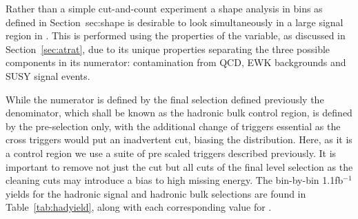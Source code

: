 Rather than a simple cut-and-count experiment a shape analysis in \HT bins as defined in Section~{sec:shape} is desirable to look simultaneously in a large signal region in \HT. This is performed using the properties of the \RaT variable, as discussed in Section~\ref{sec:atrat}, due to its unique properties separating the three possible components in its numerator: contamination from QCD, EWK backgrounds and SUSY signal events.

While the numerator is defined by the final selection defined previously the denominator, which shall be known as the hadronic bulk control region, is defined by the pre-selection only, with the additional change of triggers essential as the cross triggers would put an inadvertent \MHT cut, biasing the \alt distribution. Here, as it is a control region we use a suite of pre scaled \HT triggers described previously. It is important to remove not just the \alt cut but all cuts of the final level selection as the cleaning cuts may introduce a bias to high missing energy. The bin-by-bin 1.1fb$^{-1}$ yields for the hadronic signal and hadronic bulk selections are found in Table~\ref{tab:hadyield}, along with each corresponding value for \RaT.

